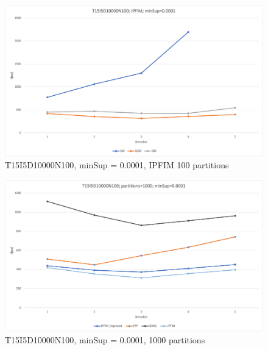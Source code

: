 \begin{figure}
  \centering
  \includegraphics[width=\linewidth]{figures/4iterations/T15I5D10000N100_ipfim_0001}
  \caption{T15I5D10000N100, minSup = 0.0001,  IPFIM 100 partitions}
  \label{fig:T15I5D10000N100_ipfim_0001}
\end{figure}

\begin{figure}
  \centering
  \includegraphics[width=\linewidth]{figures/4iterations/T15I5D10000N100_1000part_0001}
  \caption{T15I5D10000N100, minSup = 0.0001,  1000 partitions}
  \label{fig:T15I5D10000N100_1000part_0001}
\end{figure}

